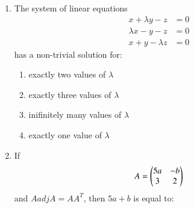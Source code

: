 \documentclass[journal,12pt,twocolumn]{IEEEtran}
\theoremstyle{remark}
\begin{document}
\begin{enumerate}
\begin{enumerate}
	\end{enumerate}


	\item The system of linear equations 
	\begin{align*}
		x+\lambda y-z &= 0\\
		\lambda x-y-z &= 0\\
		x+y-\lambda z &= 0
	\end{align*}
	has a non-trivial solution for:

	\hfill{}
	\begin{enumerate}
		\item exactly two values of $\lambda$ 
		\item exactly three values of $\lambda$ 
		\item inifinitely many values of $\lambda$
		\item exactly one value of $\lambda$ 
	\end{enumerate}


\item If \begin{align*} A = \begin{pmatrix}5a&-b\\3&2\end{pmatrix}\end{align*} and $A adj A = AA^{T}$, then $5a + b$ is equal to: 
	\hfill{}
	\begin{enumerate}

	\end{enumerate}


\end{enumerate}
\end{document}
